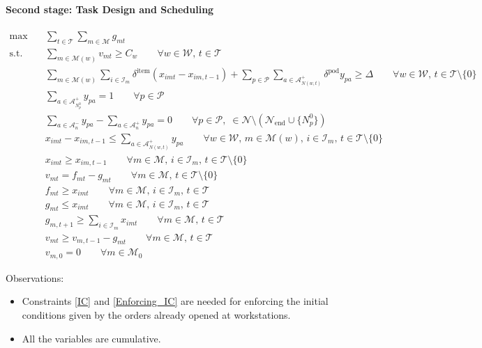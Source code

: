 \documentclass[a4paper,10pt]{article}
\begin{document}
\paragraph{Second stage: Task Design and Scheduling}
\begin{align}
    \max \quad
    & \sum_{t \in \mathcal{T}} \sum_{m \in \mathcal{M}} g_{mt} \label{M2_Obj} \\[4pt]
    \text{s.t.} \quad
    & \sum_{m \in \mathcal{M}(w)} v_{mt} \ge C_w
     \qquad \forall w \in \mathcal{W},\, t \in \mathcal{T} \label{M2_Constr1} \\
    & \sum_{m \in \mathcal{M}(w)} \sum_{i \in \mathcal{I}_m}
    \delta^{\text{item}} (x_{imt} - x_{im,t-1})
    + \sum_{p \in \mathcal{P}} \sum_{a \in \mathcal{A}^+_{N(w,t)}}
    \delta^{\text{pod}} y_{pa}
    \ge \Delta
     \qquad \forall w \in \mathcal{W},\, t \in \mathcal{T} \setminus \{0\}
    \label{M2_Constr2} \\
    & \sum_{a \in \mathcal{A}^+_{N_p^0}} y_{pa} = 1
     \qquad \forall p \in \mathcal{P} \label{M2_Constr3} \\
    & \sum_{a \in \mathcal{A}^-_{n}} y_{pa}
    - \sum_{a \in \mathcal{A}^+_{n}} y_{pa} = 0
     \qquad \forall p \in \mathcal{P},\;
    \in \mathcal{N} \setminus \left(\mathcal{N}_{\text{end}} \cup \{N_p^0\}\right)
    \label{M2_Constr4} \\
    & x_{imt} - x_{im,t-1}
    \le \sum_{a \in \mathcal{A}^+_{N(w,t)}} y_{pa}
     \qquad \forall w \in \mathcal{W},\, m \in \mathcal{M}(w),\, i \in \mathcal{I}_m,\, t \in \mathcal{T} \setminus \{0\} \\
    & x_{imt} \ge x_{im,t-1}
     \qquad \forall m \in \mathcal{M},\, i \in \mathcal{I}_m,\, t \in \mathcal{T} \setminus \{0\} \\
    & v_{mt} = f_{mt} - g_{mt}
     \qquad \forall m \in \mathcal{M},\, t \in \mathcal{T} \setminus \{0\} \\
    & f_{mt} \ge x_{imt}
     \qquad \forall m \in \mathcal{M},\, i \in \mathcal{I}_m,\, t \in \mathcal{T} \\
    & g_{mt} \le x_{imt}
     \qquad \forall m \in \mathcal{M},\, i \in \mathcal{I}_m,\, t \in \mathcal{T} \\
    & g_{m,t+1} \ge \sum_{i \in \mathcal{I}_m} x_{imt}
     \qquad \forall m \in \mathcal{M},\, t \in \mathcal{T} \\
    & v_{mt} \ge v_{m,t-1} - g_{mt}
     \qquad \forall m \in \mathcal{M},\, t \in \mathcal{T} \label{Enforcing_IC} \\
    & v_{m,0} = 0
     \qquad \forall m \in \mathcal{M}_0 \label{IC}
\end{align}

Observations:
\begin{itemize}
    \item Constraints \eqref{IC} and \eqref{Enforcing_IC} are needed for enforcing the initial conditions given by the orders already opened at workstations.
    \item All the variables are cumulative.
\end{itemize}



\newpage
\printbibliography
\end{document}
